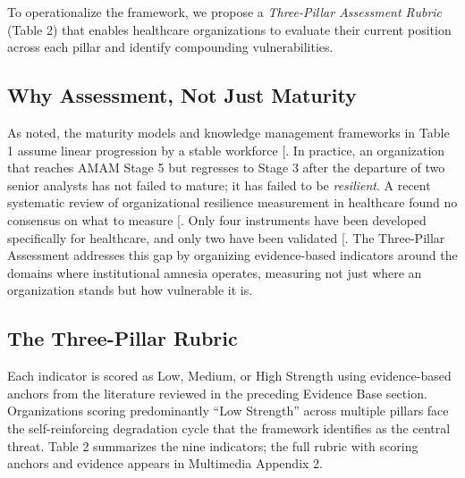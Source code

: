 \documentclass[
  american,
  11pt,
  letterpaper,
  oneside  ,captions=tableheading
]{scrartcl}
\begin{document}
To operationalize the framework, we propose a \emph{Three-Pillar
Assessment Rubric} (Table 2) that enables healthcare organizations to
evaluate their current position across each pillar and identify
compounding vulnerabilities.

\subsection{Why Assessment, Not Just
Maturity}\label{why-assessment-not-just-maturity}

As noted, the maturity models and knowledge management frameworks in
Table 1 assume linear progression by a stable workforce
{[}\citeproc{ref-himss2024}{1}{]}. In practice, an organization that
reaches AMAM Stage 5 but regresses to Stage 3 after the departure of two
senior analysts has not failed to mature; it has failed to be
\emph{resilient}. A recent systematic review of organizational
resilience measurement in healthcare found no consensus on what to
measure {[}\citeproc{ref-ignatowicz2023}{65}{]}. Only four instruments
have been developed specifically for healthcare, and only two have been
validated {[}\citeproc{ref-ratliff2025}{66}{]}. The Three-Pillar
Assessment addresses this gap by organizing evidence-based indicators
around the domains where institutional amnesia operates, measuring not
just where an organization stands but how vulnerable it is.

\subsection{The Three-Pillar Rubric}\label{the-three-pillar-rubric}

Each indicator is scored as Low, Medium, or High Strength using
evidence-based anchors from the literature reviewed in the preceding
Evidence Base section. Organizations scoring predominantly ``Low
Strength'' across multiple pillars face the self-reinforcing degradation
cycle that the framework identifies as the central threat. Table 2
summarizes the nine indicators; the full rubric with scoring anchors and
evidence appears in Multimedia Appendix 2.
\end{document}
